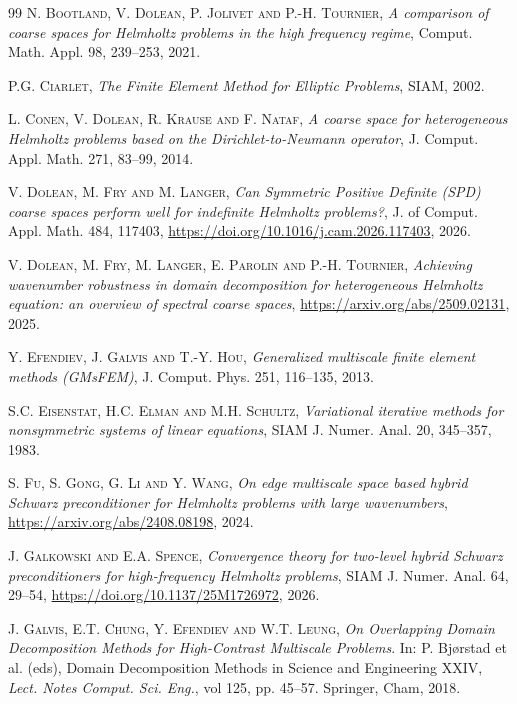 \documentclass[numbers,webpdf,imaiai]{ima-authoring-template}%
\theoremstyle{thmstyletwo}%
\numberwithin{equation}{section}
\numberwithin{equation}{section}
\begin{document}
{\begin{thebibliography}{99}
\textsc{N. Bootland, V. Dolean, P. Jolivet and P.-H. Tournier}, 
\textit{A comparison of coarse spaces for Helmholtz problems in the high frequency regime}, 
Comput. Math. Appl. 98, 239--253, 2021.

\textsc{P.G. Ciarlet}, 
\textit{The Finite Element Method for Elliptic Problems}, SIAM, 2002.

\textsc{L. Conen, V. Dolean, R. Krause and F. Nataf}, 
\textit{A coarse space for heterogeneous Helmholtz problems based on the Dirichlet-to-Neumann operator},
J. Comput. Appl. Math. 271, 83--99, 2014.

\textsc{V. Dolean, M. Fry and  M. Langer}, 
\textit{Can Symmetric Positive Definite (SPD) coarse spaces perform well for indefinite Helmholtz problems?}, 
J. of Comput. Appl. Math. 484, 117403, 
\url{https://doi.org/10.1016/j.cam.2026.117403}, 2026.

\textsc{V. Dolean, M. Fry,  M. Langer, E. Parolin and P.-H. Tournier}, 
\textit{Achieving wavenumber robustness in domain decomposition for heterogeneous Helmholtz equation: 
an overview of spectral coarse spaces},
\url{https://arxiv.org/abs/2509.02131}, 2025.

\textsc{Y. Efendiev, J. Galvis and T.-Y. Hou},
\textit{Generalized multiscale finite element methods (GMsFEM)},
J. Comput. Phys. 251, 116--135, 2013.

\textsc{S.C. Eisenstat, H.C. Elman and M.H. Schultz}, 
\textit{Variational iterative methods for nonsymmetric systems of linear equations}, 
SIAM J. Numer. Anal. 20, 345--357, 1983.

\textsc{S. Fu, S. Gong, G. Li and Y. Wang},
\textit{On edge multiscale space based hybrid Schwarz preconditioner for Helmholtz problems with large wavenumbers},
\url{https://arxiv.org/abs/2408.08198}, 2024.

\textsc{J. Galkowski and E.A. Spence},
\textit{Convergence theory for two-level hybrid Schwarz preconditioners for high-frequency Helmholtz problems},
SIAM J. Numer. Anal. 64, 29--54,
\url{https://doi.org/10.1137/25M1726972}, 2026.

\textsc{J. Galvis, E.T. Chung, Y. Efendiev and W.T. Leung},
\textit{On Overlapping Domain Decomposition Methods for High-Contrast Multiscale Problems}.
In: P. Bj{\o}rstad  et al. (eds), Domain Decomposition Methods in Science and Engineering XXIV, 
\textit{Lect. Notes Comput. Sci. Eng.}, vol 125, pp. 45--57. Springer, Cham, 2018.


\end{thebibliography}}
\end{document}
